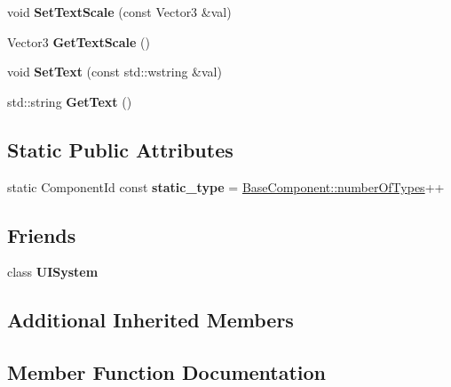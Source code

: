 \begin{DoxyCompactItemize}
void {\bfseries Set\+Text\+Scale} (const Vector3 \&val)
\item 
\mbox{\label{classUIComponent_a94e0086e0f64810b6bfd0de31a1b5e96}} 
Vector3 {\bfseries Get\+Text\+Scale} ()
\item 
\mbox{\label{classUIComponent_ab9139c6c1e7298ca46fcc36e752a24ed}} 
void {\bfseries Set\+Text} (const std\+::wstring \&val)
\item 
\mbox{\label{classUIComponent_ab9063507aba8641fc46c6bfab649d2b3}} 
std\+::string {\bfseries Get\+Text} ()
\end{DoxyCompactItemize}
\subsection*{Static Public Attributes}
\begin{DoxyCompactItemize}
\item 
\mbox{\label{classUIComponent_a58909a9d1900904429ae4070bf1e2f0a}} 
static Component\+Id const {\bfseries static\+\_\+type} = \hyperlink{classBaseComponent_a084ade347bc71a7f0d3b17ecdc2225a4}{Base\+Component\+::number\+Of\+Types}++
\end{DoxyCompactItemize}
\subsection*{Friends}
\begin{DoxyCompactItemize}
\item 
\mbox{\label{classUIComponent_a3c5cff3eae5326599fd1851d48d2a07b}} 
class {\bfseries U\+I\+System}
\end{DoxyCompactItemize}
\subsection*{Additional Inherited Members}


\subsection{Member Function Documentation}
\mbox{\label{classUIComponent_ace6f4cbb1c52f59378b3a33c127dda2c}} 
